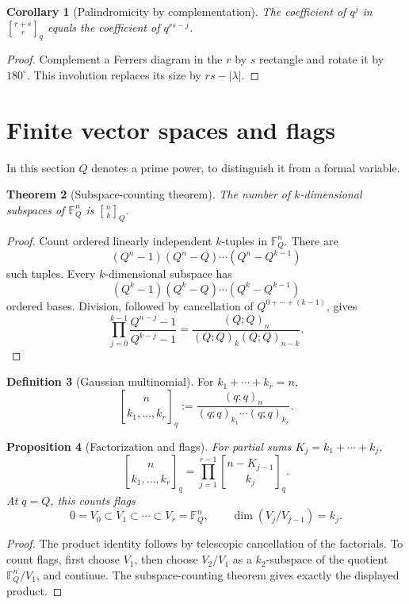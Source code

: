 \documentclass[11pt]{article}
\numberwithin{equation}{section}
\newtheorem{theorem}{Theorem}[section]
\newtheorem{proposition}[theorem]{Proposition}
\newtheorem{corollary}[theorem]{Corollary}
\theoremstyle{definition}
\newtheorem{definition}[theorem]{Definition}
\newcommand{\F}{\mathbb F}
\begin{document}
\begin{corollary}[Palindromicity by complementation]
The coefficient of $q^j$ in $\genfrac{[}{]}{0pt}{}{r+s}{r}_q$ equals the coefficient of $q^{rs-j}$.
\end{corollary}
\begin{proof}
Complement a Ferrers diagram in the $r$ by $s$ rectangle and rotate it by $180^\circ$.  This involution replaces its size by $rs-|\lambda|$.
\end{proof}

\section{Finite vector spaces and flags}
In this section $Q$ denotes a prime power, to distinguish it from a formal variable.

\begin{theorem}[Subspace-counting theorem]
The number of $k$-dimensional subspaces of $\F_Q^n$ is $\genfrac{[}{]}{0pt}{}{n}{k}_{Q}$.
\end{theorem}
\begin{proof}
Count ordered linearly independent $k$-tuples in $\F_Q^n$.  There are
\[
(Q^n-1)(Q^n-Q)\cdots(Q^n-Q^{k-1})
\]
such tuples.  Every $k$-dimensional subspace has
\[
(Q^k-1)(Q^k-Q)\cdots(Q^k-Q^{k-1})
\]
ordered bases.  Division, followed by cancellation of $Q^{0+\cdots+(k-1)}$, gives
\[
\prod_{j=0}^{k-1}\frac{Q^{n-j}-1}{Q^{k-j}-1}
=\frac{(Q;Q)_n}{(Q;Q)_k(Q;Q)_{n-k}}.
\]
\end{proof}

\begin{definition}[Gaussian multinomial]
For $k_1+\cdots+k_r=n$,
\[
\genfrac{[}{]}{0pt}{}{n}{k_1,\ldots,k_r}_q
:=\frac{(q;q)_n}{(q;q)_{k_1}\cdots(q;q)_{k_r}}.
\]
\end{definition}

\begin{proposition}[Factorization and flags]
For partial sums $K_j=k_1+\cdots+k_j$,
\[
\genfrac{[}{]}{0pt}{}{n}{k_1,\ldots,k_r}_q
=\prod_{j=1}^{r-1}\genfrac{[}{]}{0pt}{}{n-K_{j-1}}{k_j}_q.
\]
At $q=Q$, this counts flags
\[
0=V_0\subset V_1\subset\cdots\subset V_r=\F_Q^n,
\qquad \dim(V_j/V_{j-1})=k_j.
\]
\end{proposition}
\begin{proof}
The product identity follows by telescopic cancellation of the factorials.  To count flags, first choose $V_1$, then choose $V_2/V_1$ as a $k_2$-subspace of the quotient $\F_Q^n/V_1$, and continue.  The subspace-counting theorem gives exactly the displayed product.
\end{proof}
\end{document}
